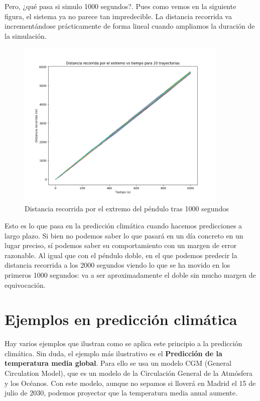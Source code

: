 \documentclass[
  10pt,
  a4paper,
  DIV=11,
  numbers=noendperiod,
  open=any]{scrreprt}
\numberwithin{equation}{chapter}
\numberwithin{equation}{section}
\renewcommand{\[}{\begin{equation}}
\renewcommand{\]}{\end{equation}}
\begin{document}
Pero, ¿qué pasa si simulo 1000 segundos?. Pues como vemos en la
siguiente figura, el sistema ya no parece tan impredecible. La distancia
recorrida va incrementándose prácticamente de forma lineal cuando
ampliamos la duración de la simulación.

\begin{figure}[h]
  \centering
  \includegraphics[width=0.9\textwidth]{02-pendulo-doble/Distancia1000.png}
  \caption{Distancia recorrida por el extremo del péndulo tras 1000 segundos}
\end{figure}


Esto es lo que pasa en la predicción climática cuando
hacemos predicciones a largo plazo. Si bien no podemos saber lo que
pasará en un día concreto en un lugar preciso, sí podemos saber su
comportamiento con un margen de error razonable. Al igual que con el
péndulo doble, en el que podemos predecir la distancia recorrida a los
2000 segundos viendo lo que se ha movido en los primeros 1000 segundos:
va a ser aproximadamente el doble sin mucho margen de equivocación.

\section{Ejemplos en predicción
climática}\label{ejemplos-en-predicciuxf3n-climuxe1tica}

Hay varios ejemplos que ilustran como se aplica este principio a la
predicción climática. Sin duda, el ejemplo más ilustrativo es el
\textbf{Predicción de la temperatura media global}. Para ello se usa un
modelo CGM (General Circulation Model), que es un modelo de la
Circulación General de la Atmósfera y los Océanos. Con este modelo,
aunque no sepamos si lloverá en Madrid el 15 de julio de 2030, podemos
proyectar que la temperatura media anual aumente.
\end{document}
